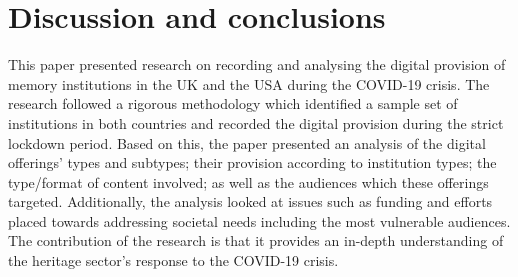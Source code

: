 \documentclass{egpubl}
\begin{document}






\section{Discussion and conclusions}
\label{disc}
This paper presented research on recording and analysing the digital provision of memory institutions in the UK and the USA during the COVID-19 crisis. The research followed a rigorous methodology which identified a sample set of institutions in both countries and recorded the digital provision during the strict lockdown period. Based on this, the paper presented an analysis of the digital offerings' types and subtypes; their provision according to institution types; the type/format of content involved; as well as the audiences which these offerings targeted. Additionally, the analysis looked at issues such as funding and efforts placed towards addressing societal needs including the most vulnerable audiences. The contribution of the research is that it provides an in-depth understanding of the heritage sector's response to the COVID-19 crisis.
\end{document}
